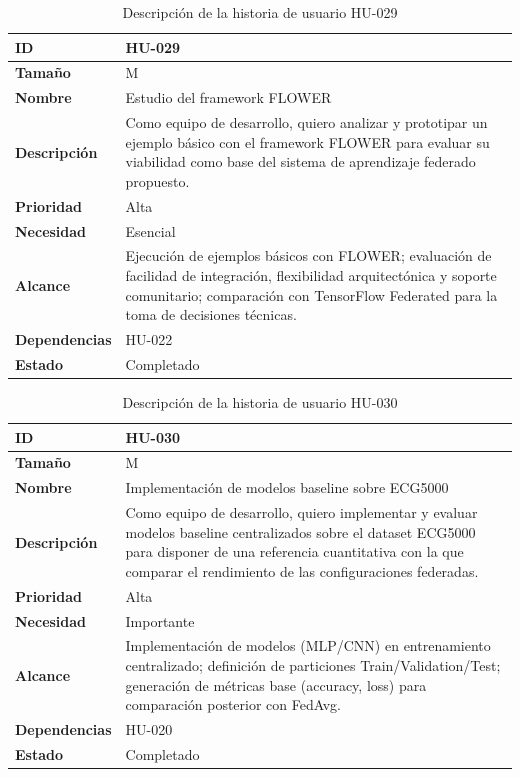 \documentclass{report}
\begin{document}
\begin{table}[H]
\centering
\caption{Descripción de la historia de usuario HU-029}
\label{tab:hu029}
\begin{tabular}{|l|p{12cm}|}
\hline
\textbf{ID} & HU-029 \\ \hline
\textbf{Tamaño} & M \\ \hline
\textbf{Nombre} & Estudio del framework FLOWER \\ \hline
\textbf{Descripción} &
Como equipo de desarrollo, quiero analizar y prototipar un ejemplo básico con el framework FLOWER para evaluar su viabilidad como base del sistema de aprendizaje federado propuesto. \\ \hline
\textbf{Prioridad} & Alta \\ \hline
\textbf{Necesidad} & Esencial \\ \hline
\textbf{Alcance} &
Ejecución de ejemplos básicos con FLOWER; evaluación de facilidad de integración, flexibilidad arquitectónica y soporte comunitario; comparación con TensorFlow Federated para la toma de decisiones técnicas. \\ \hline
\textbf{Dependencias} & HU-022 \\ \hline
\textbf{Estado} & Completado \\ \hline
\end{tabular}
\end{table}



\begin{table}[H]
\centering
\caption{Descripción de la historia de usuario HU-030}
\label{tab:hu030}
\begin{tabular}{|l|p{12cm}|}
\hline
\textbf{ID} & HU-030 \\ \hline
\textbf{Tamaño} & M \\ \hline
\textbf{Nombre} & Implementación de modelos baseline sobre ECG5000 \\ \hline
\textbf{Descripción} &
Como equipo de desarrollo, quiero implementar y evaluar modelos baseline centralizados sobre el dataset ECG5000 para disponer de una referencia cuantitativa con la que comparar el rendimiento de las configuraciones federadas. \\ \hline
\textbf{Prioridad} & Alta \\ \hline
\textbf{Necesidad} & Importante \\ \hline
\textbf{Alcance} &
Implementación de modelos (MLP/CNN) en entrenamiento centralizado; definición de particiones Train/Validation/Test; generación de métricas base (accuracy, loss) para comparación posterior con FedAvg. \\ \hline
\textbf{Dependencias} & HU-020 \\ \hline
\textbf{Estado} & Completado \\ \hline
\end{tabular}
\end{table}
\end{document}
